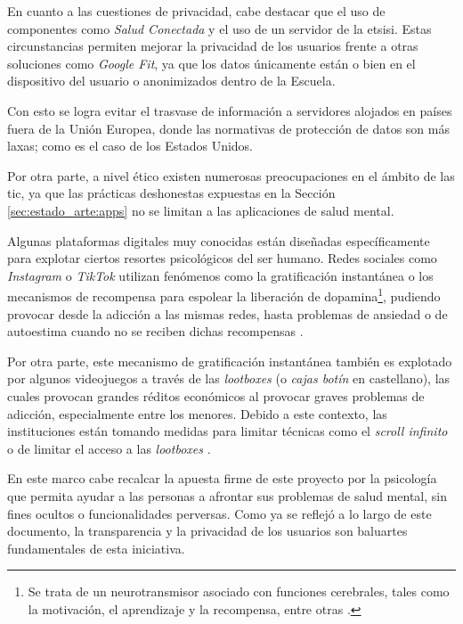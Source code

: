     En cuanto a las cuestiones de privacidad, cabe destacar que el uso de componentes como \textit{Salud Conectada} y el uso de un servidor de la \gls{etsisi}. Estas circunstancias permiten mejorar la privacidad de los usuarios frente a otras soluciones como \textit{Google Fit}, ya que los datos únicamente están o bien en el dispositivo del usuario o anonimizados dentro de la Escuela. 
    
    Con esto se logra evitar el trasvase de información a servidores alojados en países fuera de la Unión Europea, donde las normativas de protección de datos son más laxas; como es el caso de los Estados Unidos. 

    Por otra parte, a nivel ético existen numerosas preocupaciones en el ámbito de las \gls{tic}, ya que las prácticas deshonestas expuestas en la Sección \ref{sec:estado_arte:apps} no se limitan a las aplicaciones de salud mental.
    
    Algunas plataformas digitales muy conocidas están diseñadas específicamente para explotar ciertos resortes psicológicos del ser humano. Redes sociales como \textit{Instagram} o \textit{TikTok} utilizan fenómenos como la gratificación instantánea o los mecanismos de recompensa \cite{noauthor_dopamina_2022} para espolear la liberación de dopamina\footnote{Se trata de un neurotransmisor asociado con funciones cerebrales, tales como la motivación, el aprendizaje y la recompensa, entre otras \cite{gil_que_2023}.}, pudiendo provocar desde la adicción a las mismas redes, hasta problemas de ansiedad o de autoestima cuando no se reciben dichas recompensas \cite{ina_impacto_2023}.
    
    Por otra parte, este mecanismo de gratificación instantánea también es explotado por algunos videojuegos a través de las \textit{lootboxes} (o \textit{cajas botín} en castellano), las cuales provocan grandes réditos económicos al provocar graves problemas de adicción, especialmente entre los menores. Debido a este contexto, las instituciones están tomando medidas para limitar técnicas como el \textit{scroll infinito} \cite{alconchel_prohibir_2023} o de limitar el acceso a las \textit{lootboxes} \cite{ministerio_de_derechos_sociales_consumo_y_agenda_2030_ministerio_2024} \cite{garcia_espanda_2024}. 
    
    En este marco cabe recalcar la apuesta firme de este proyecto por la psicología que permita ayudar a las personas a afrontar sus problemas de salud mental, sin fines ocultos o funcionalidades perversas. Como ya se reflejó a lo largo de este documento, la transparencia y la privacidad de los usuarios son baluartes fundamentales de esta iniciativa.

